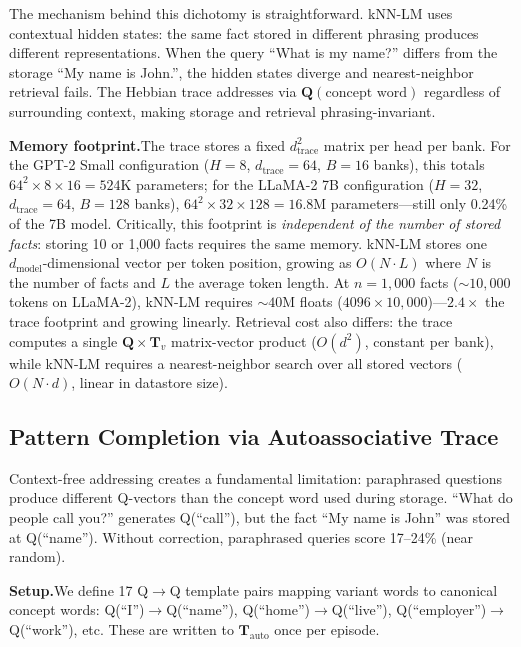 \documentclass[11pt,a4paper]{article}
\begin{document}
The mechanism behind this dichotomy is straightforward. kNN-LM uses contextual hidden states: the same fact stored in different phrasing produces different representations. When the query ``What is my name?'' differs from the storage ``My name is John.'', the hidden states diverge and nearest-neighbor retrieval fails. The Hebbian trace addresses via $\mathbf{Q}(\text{concept word})$ regardless of surrounding context, making storage and retrieval phrasing-invariant.

\textbf{Memory footprint.}\quad The trace stores a fixed $d_{\text{trace}}^2$ matrix per head per bank. For the GPT-2 Small configuration ($H{=}8$, $d_{\text{trace}}{=}64$, $B{=}16$ banks), this totals $64^2 \times 8 \times 16 = 524\text{K}$ parameters; for the LLaMA-2 7B configuration ($H{=}32$, $d_{\text{trace}}{=}64$, $B{=}128$ banks), $64^2 \times 32 \times 128 = 16.8\text{M}$ parameters---still only 0.24\% of the 7B model. Critically, this footprint is \emph{independent of the number of stored facts}: storing 10 or 1,000 facts requires the same memory. kNN-LM stores one $d_{\text{model}}$-dimensional vector per token position, growing as $O(N \cdot L)$ where $N$ is the number of facts and $L$ the average token length. At $n{=}1{,}000$ facts (${\sim}10{,}000$ tokens on LLaMA-2), kNN-LM requires ${\sim}40\text{M}$ floats ($4096 \times 10{,}000$)---$2.4\times$ the trace footprint and growing linearly. Retrieval cost also differs: the trace computes a single $\mathbf{Q} \times \mathbf{T}_v$ matrix-vector product ($O(d^2)$, constant per bank), while kNN-LM requires a nearest-neighbor search over all stored vectors ($O(N \cdot d)$, linear in datastore size).

\subsection{Pattern Completion via Autoassociative Trace}
\label{sec:tauto_exp}

Context-free addressing creates a fundamental limitation: paraphrased questions produce different Q-vectors than the concept word used during storage. ``What do people call you?'' generates Q(``call''), but the fact ``My name is John'' was stored at Q(``name''). Without correction, paraphrased queries score 17--24\% (near random).

\textbf{Setup.}\quad We define 17 Q$\to$Q template pairs mapping variant words to canonical concept words: Q(``I'')$\to$Q(``name''), Q(``home'')$\to$Q(``live''), Q(``employer'')$\to$Q(``work''), etc. These are written to $\mathbf{T}_{\text{auto}}$ once per episode.
\end{document}
